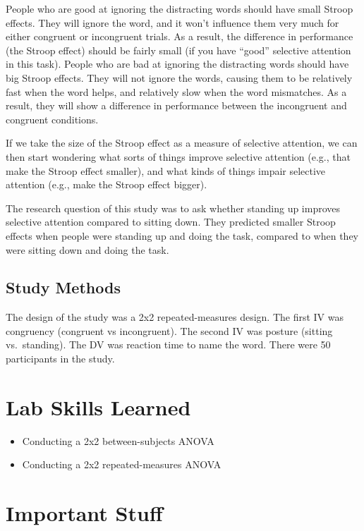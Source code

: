 \documentclass[]{book}
\providecommand{\tightlist}{%
  \setlength{\itemsep}{0pt}\setlength{\parskip}{0pt}}
\theoremstyle{definition}
\theoremstyle{definition}
\theoremstyle{definition}
\theoremstyle{remark}
\begin{document}
People who are good at ignoring the distracting words should have small
Stroop effects. They will ignore the word, and it won't influence them
very much for either congruent or incongruent trials. As a result, the
difference in performance (the Stroop effect) should be fairly small (if
you have ``good'' selective attention in this task). People who are bad
at ignoring the distracting words should have big Stroop effects. They
will not ignore the words, causing them to be relatively fast when the
word helps, and relatively slow when the word mismatches. As a result,
they will show a difference in performance between the incongruent and
congruent conditions.

If we take the size of the Stroop effect as a measure of selective
attention, we can then start wondering what sorts of things improve
selective attention (e.g., that make the Stroop effect smaller), and
what kinds of things impair selective attention (e.g., make the Stroop
effect bigger).

The research question of this study was to ask whether standing up
improves selective attention compared to sitting down. They predicted
smaller Stroop effects when people were standing up and doing the task,
compared to when they were sitting down and doing the task.

\subsection{Study Methods}\label{study-methods-2}

The design of the study was a 2x2 repeated-measures design. The first IV
was congruency (congruent vs incongruent). The second IV was posture
(sitting vs.~standing). The DV was reaction time to name the word. There
were 50 participants in the study.

\section{Lab Skills Learned}\label{lab-skills-learned-4}

\begin{itemize}
\tightlist
\item
  Conducting a 2x2 between-subjects ANOVA
\item
  Conducting a 2x2 repeated-measures ANOVA
\end{itemize}

\section{Important Stuff}\label{important-stuff-4}
\end{document}
